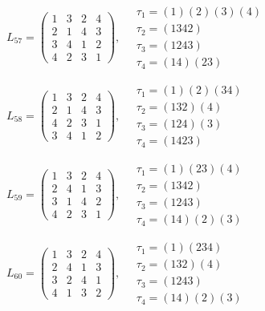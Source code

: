 $L_{57} = \begin{pmatrix} 1 & 3 & 2 & 4 \\ 2 & 1 & 4 & 3 \\ 3 & 4 & 1 & 2 \\ 4 & 2 & 3 & 1 \end{pmatrix}, \quad \begin{matrix} \tau_{1} = (1)(2)(3)(4) \\ \tau_{2} = (1 3 4 2) \\ \tau_{3} = (1 2 4 3) \\ \tau_{4} = (1 4)(2 3) \end{matrix}$

$L_{58} = \begin{pmatrix} 1 & 3 & 2 & 4 \\ 2 & 1 & 4 & 3 \\ 4 & 2 & 3 & 1 \\ 3 & 4 & 1 & 2 \end{pmatrix}, \quad \begin{matrix} \tau_{1} = (1)(2)(3 4) \\ \tau_{2} = (1 3 2)(4) \\ \tau_{3} = (1 2 4)(3) \\ \tau_{4} = (1 4 2 3) \end{matrix}$

$L_{59} = \begin{pmatrix} 1 & 3 & 2 & 4 \\ 2 & 4 & 1 & 3 \\ 3 & 1 & 4 & 2 \\ 4 & 2 & 3 & 1 \end{pmatrix}, \quad \begin{matrix} \tau_{1} = (1)(2 3)(4) \\ \tau_{2} = (1 3 4 2) \\ \tau_{3} = (1 2 4 3) \\ \tau_{4} = (1 4)(2)(3) \end{matrix}$

$L_{60} = \begin{pmatrix} 1 & 3 & 2 & 4 \\ 2 & 4 & 1 & 3 \\ 3 & 2 & 4 & 1 \\ 4 & 1 & 3 & 2 \end{pmatrix}, \quad \begin{matrix} \tau_{1} = (1)(2 3 4) \\ \tau_{2} = (1 3 2)(4) \\ \tau_{3} = (1 2 4 3) \\ \tau_{4} = (1 4)(2)(3) \end{matrix}$

